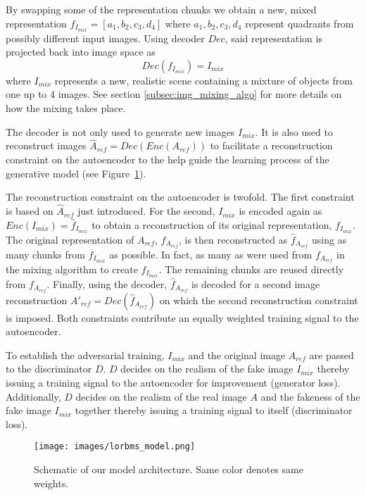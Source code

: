 \documentclass[a4paper,12pt]{report}
\begin{document}
By swapping some of the representation chunks we obtain a new, mixed representation $f_{I_{mix}} = [a_1, b_2, c_3, d_4]$ where $a_1,b_2,c_3,d_4$ represent quadrants from possibly different input images. Using decoder $Dec$, said representation is projected back into image space as
\begin{equation} \label{eq:3}
    Dec(f_{I_{mix}}) = I_{mix}
\end{equation}
where $I_{mix}$ represents a new, realistic scene containing a mixture of objects from one up to 4 images. See section \ref{subsec:img_mixing_algo} for more details on how the mixing takes place.

The decoder is not only used to generate new images $I_{mix}$. It is also used to reconstruct images $\hat{A}_{ref} = Dec(Enc(A_{ref}))$ to facilitate a reconstruction constraint on the autoencoder to the help guide the learning process of the generative model (see Figure~\ref{fig:model_arch}).

The reconstruction constraint on the autoencoder is twofold. The first constraint is based on $\hat{A}_{ref}$ just introduced. For the second, $I_{mix}$ is encoded again as $Enc(I_{mix}) = \hat{f}_{I_{mix}}$ to obtain a reconstruction of its original representation, $f_{I_{mix}}$. The original representation of $A_{ref}$, $f_{A_{ref}}$, is then reconstructed as $\hat{f}_{A_{ref}}$ using as many chunks from $\hat{f}_{I_{mix}}$ as possible. In fact, as many as were used from $f_{A_{ref}}$ in the mixing algorithm to create $f_{I_{mix}}$. The remaining chunks are reused directly from $f_{A_{ref}}$. Finally, using the decoder, $\hat{f}_{A_{ref}}$ is decoded for a second image reconstruction $A'_{ref} = Dec(\hat{f}_{A_{ref}})$ on which the second reconstruction constraint is imposed. Both constraints contribute an equally weighted training signal to the autoencoder.

To establish the adversarial training, $I_{mix}$ and the original image $A_{ref}$ are passed to the discriminator $D$. $D$ decides on the realism of the fake image $I_{mix}$ thereby issuing a training signal to the autoencoder for improvement (generator loss). Additionally, $D$ decides on the realism of the real image $A$ and the fakeness of the fake image $I_{mix}$ together thereby issuing a training signal to itself (discriminator loss).

\begin{figure}[ht]
\centering
\texttt{[image: images/lorbms\_model.png]}
\caption{Schematic of our model architecture. Same color denotes same weights.}
\label{fig:model_arch}
\end{figure}
\end{document}
